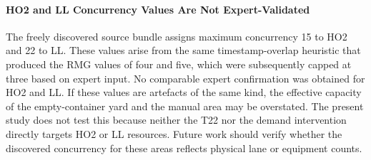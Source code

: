 \paragraph{HO2 and LL Concurrency Values Are Not Expert-Validated}

The freely discovered source bundle assigns maximum concurrency 15 to HO2 and
22 to LL.  These values arise from the same timestamp-overlap heuristic that
produced the RMG values of four and five, which were subsequently capped at
three based on expert input.  No comparable expert confirmation was obtained
for HO2 and LL.  If these values are artefacts of the same kind, the
effective capacity of the empty-container yard and the manual area may be
overstated.  The present study does not test this because neither the T22 nor
the demand intervention directly targets HO2 or LL resources.  Future work
should verify whether the discovered concurrency for these areas reflects
physical lane or equipment counts.
